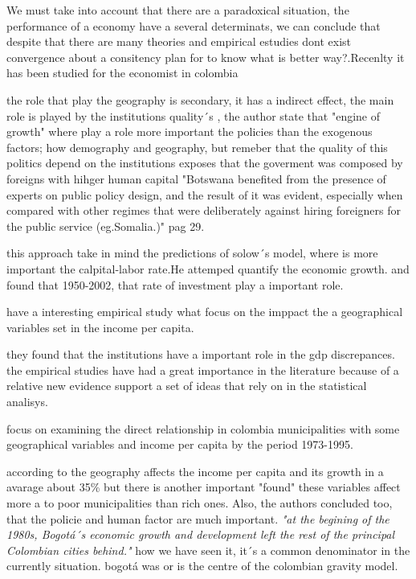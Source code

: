\documentclass[12pt,letterpaper]{report}
\begin{document}
We must take into account that there are a paradoxical situation, the performance of a economy have a several determinats, we can  conclude that despite that there are many theories and empirical estudies dont exist convergence about a consitency     plan for to know what is better way?.Recenlty it has been studied for the economist in colombia 


the role that play the geography is secondary, it has a indirect effect, the main role is played by the institutions quality´s \cite{clavijo}, the author state that "engine of growth" where play a role more important the policies than the exogenous factors; how demography and geography, but remeber that the quality of this politics depend on the institutions \cite{rodriguez} exposes that the goverment was composed by foreigns with hihger human capital "Botswana benefited from the presence of experts on public policy design, and the result of it was evident, especially when compared with other regimes that were deliberately against hiring foreigners for the public service (eg.Somalia.)"  pag 29.

this approach take  in mind the predictions of solow´s model, where is more important the calpital-labor rate.He attemped quantify the economic growth. and found that 1950-2002, that rate of investment play a important role.

\cite{mendoza} have a interesting empirical study what focus on the imppact the a geographical variables set in the income per capita.

they found that the institutions have a important role in the gdp discrepances. the empirical studies have had a great importance in the literature because of a relative new evidence support a set of ideas that rely  on in the statistical analisys. 

\cite{sanchez}  focus on examining the direct relationship in colombia municipalities with some geographical variables and income per capita by the period 1973-1995.

according to \cite{sanchez} the geography affects the income per capita and its growth in a avarage about 35\% but there is another important "found" these variables affect more a to poor municipalities than rich ones. Also, the authors concluded too, that the policie and human factor are  much important. \textit{ "at the begining of the 1980s, Bogotá´s economic growth and  development left the rest of the principal Colombian cities behind."} how we have seen it, it´s a common denominator in the currently situation. bogotá was or is the centre of the colombian gravity model.
\end{document}
